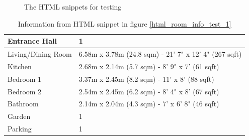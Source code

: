 \documentclass[12pt,twoside]{report}
\begin{document}
\begin{figure}[!htbp]
	\centering
	\hfill
	\caption{The HTML snippets for testing}
	\label{html_room_info_test}
\end{figure}

\begin{table}[!htbp]
	\centering
	\caption{Information from HTML snippet in figure \ref{html_room_info_test_1}}
	\begin{tabular} {| l | l |}
		\hline
		Entrance Hall & 1\\
		\hline
		Living/Dining Room & 6.58m x 3.78m (24.8 sqm) - 21' 7" x 12' 4" (267 sqft)\\
		\hline
		Kitchen & 2.68m x 2.14m (5.7 sqm) - 8' 9" x 7' (61 sqft)\\
		\hline
		Bedroom 1 & 3.37m x 2.45m (8.2 sqm) - 11' x 8' (88 sqft)\\
		\hline
		Bedroom 2 & 2.54m x 2.45m (6.2 sqm) - 8' 4" x 8' (67 sqft)\\
		\hline 
		Bathroom & 2.14m x 2.04m (4.3 sqm) - 7' x 6' 8" (46 sqft)\\
		\hline
		Garden & 1\\
		\hline
		Parking & 1\\
		\hline
	\end{tabular}
	\label{html_room_info_expect_1}
\end{table}
\end{document}
